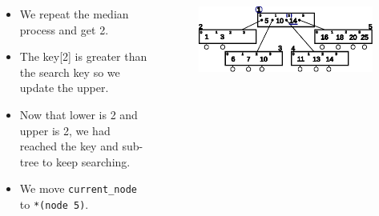 \documentclass{beamer}
\begin{document}
\begin{frame}[t,allowframebreaks]
    \begin{columns}
        \begin{column}{.4\textwidth}
            \vspace{-1cm}
            \begin{block}{}
                \begin{itemize}
                    \item We repeat the median process and get 2.
                    \item The key[2] is greater than the search key so we update the upper.
                    \item Now that lower is 2 and upper is 2, we had reached the key and sub-tree to keep searching.
                    \item We move \lstinline|current_node| to \lstinline|*(node 5)|.
                \end{itemize}
            \end{block}
        \end{column}
        \begin{column}{.6\textwidth}
            \vspace{-1cm}
            \begin{block}{}
                \begin{figure}[h!]
                    \includegraphics[width=\linewidth]{resources/made/btree_search_step2.eps}
                \end{figure}    
                \btreeSearchStepTwo
            \end{block}
        \end{column}
    \end{columns}

    \framebreak


\end{frame}
\end{document}
